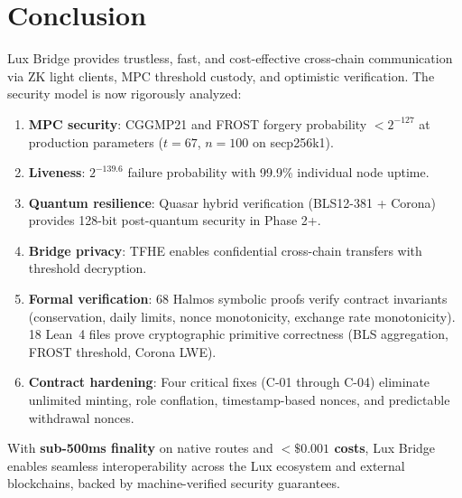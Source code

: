 \section{Conclusion}


Lux Bridge provides trustless, fast, and cost-effective cross-chain communication via ZK light clients, MPC threshold custody, and optimistic verification. The security model is now rigorously analyzed:

\begin{enumerate}[leftmargin=1.1em]
  \item \textbf{MPC security}: CGGMP21 and FROST forgery probability $< 2^{-127}$ at production parameters ($t = 67$, $n = 100$ on secp256k1).
  \item \textbf{Liveness}: $2^{-139.6}$ failure probability with 99.9\% individual node uptime.
  \item \textbf{Quantum resilience}: Quasar hybrid verification (BLS12-381 + Corona) provides 128-bit post-quantum security in Phase 2+.
  \item \textbf{Bridge privacy}: TFHE enables confidential cross-chain transfers with threshold decryption.
  \item \textbf{Formal verification}: 68 Halmos symbolic proofs verify contract invariants (conservation, daily limits, nonce monotonicity, exchange rate monotonicity). 18 Lean~4 files prove cryptographic primitive correctness (BLS aggregation, FROST threshold, Corona LWE).
  \item \textbf{Contract hardening}: Four critical fixes (C-01 through C-04) eliminate unlimited minting, role conflation, timestamp-based nonces, and predictable withdrawal nonces.
\end{enumerate}

With \textbf{sub-500ms finality} on native routes and \textbf{$< \$0.001$ costs}, Lux Bridge enables seamless interoperability across the Lux ecosystem and external blockchains, backed by machine-verified security guarantees.

\appendix

